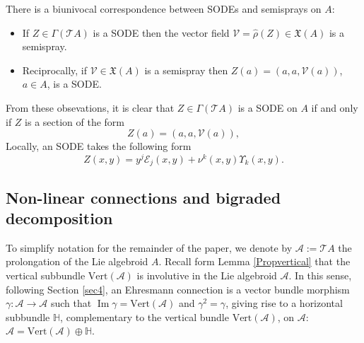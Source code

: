 \documentclass[12pt,letterpaper]{article}
\newcommand{\A}{\mathscr{A}}
\renewcommand{\hat}{\widehat}
\numberwithin{equation}{section}
\begin{document}
There is a biunivocal correspondence between SODEs and semisprays on $A$:
\begin{itemize}
\item[(i)] If $Z\in\Gamma(\mathcal{T}A) $ is a SODE then the vector field $\mathcal{V}=\hat{\rho}(Z)\in\mathfrak{X}(A)$ is a semispray.
\item[(ii)] Reciprocally, if $\mathcal{V}\in\mathfrak{X}(A)$ is a semispray then $Z(a)=(a,a,\mathcal{V}(a))$, $a\in A$, is a SODE.
\end{itemize}

From these obsevations, it is clear that $Z\in \Gamma( \mathcal{T}A) $ is a SODE on $A$ if and only if $Z$ is a section of the form
\begin{equation}
Z(a)=(a,a,\mathcal{V}(a)), 
\end{equation}
Locally, an SODE takes the following form
\begin{equation}\label{semi-coord}
Z(x,y)= y^j \mathcal{E}_j(x,y) + \nu^k(x,y) \Upsilon_k(x,y).
\end{equation}



\subsection{Non-linear connections and bigraded decomposition}

To simplify notation for the remainder of the paper, we denote by $\A:= \mathcal{T} A$
the prolongation of the Lie algebroid $A$.
Recall form Lemma \ref{Propvertical} that the vertical subbundle $\mathrm{Vert}(\A)$ is involutive in the Lie algebroid $\A$.
In this sense, following Section \ref{sec4}, an Ehresmann connection is a vector bundle morphism $\gamma:\A\to\A$ 
such that $\operatorname{Im}\gamma=\mathrm{Vert}(\A)$ and $\gamma^2=\gamma$,
giving rise to a horizontal subbundle $\mathbb{H}$, complementary to the vertical bundle $\mathrm{Vert}(\A)$, on $\A$: 
$\A=\mathrm{Vert}(\A)\oplus\mathbb{H}$.
\end{document}
